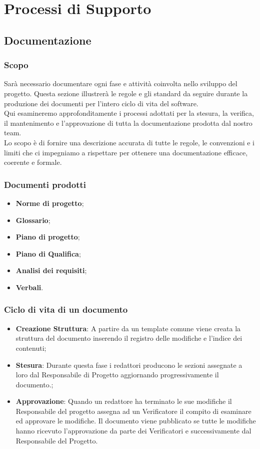 \section{Processi di Supporto}

\subsection{Documentazione}
\subsubsection{Scopo}
Sarà necessario documentare ogni fase e attività coinvolta nello sviluppo del progetto. Questa sezione illustrerà le regole e gli standard da seguire durante la produzione 
dei documenti per l'intero ciclo di vita del software. \\
Qui esamineremo approfonditamente i processi adottati per la stesura, la verifica, il mantenimento e l’approvazione di tutta la documentazione prodotta dal nostro team. \\
Lo scopo è di fornire una descrizione accurata di tutte le regole, le convenzioni e i limiti che ci impegniamo a rispettare per ottenere una documentazione efficace, coerente e formale.\\

\subsubsection{Documenti prodotti}
\begin{itemize}
    \item \textbf{Norme di progetto};
    \item \textbf{Glossario};
    \item \textbf{Piano di progetto};
    \item \textbf{Piano di Qualifica};
    \item \textbf{Analisi dei requisiti};
    \item \textbf{Verbali}.
\end{itemize}

\subsubsection{Ciclo di vita di un documento}
\begin{itemize}
    \item \textbf{Creazione Struttura}: A partire da un template comune viene creata la struttura del documento inserendo il registro delle modifiche e l’indice dei contenuti;
    \item \textbf{Stesura}: Durante questa fase i redattori producono le sezioni assegnate a loro dal Responsabile di Progetto aggiornando progressivamente il documento.;
    \item \textbf{Approvazione}: Quando un redattore ha terminato le sue modifiche il Responsabile del progetto assegna ad un Verificatore il compito di esaminare ed approvare le modifiche.
Il documento viene pubblicato se tutte le modifiche hanno ricevuto l’approvazione da parte dei Verificatori e successivamente dal Responsabile del Progetto.
\end{itemize}
\newpage
